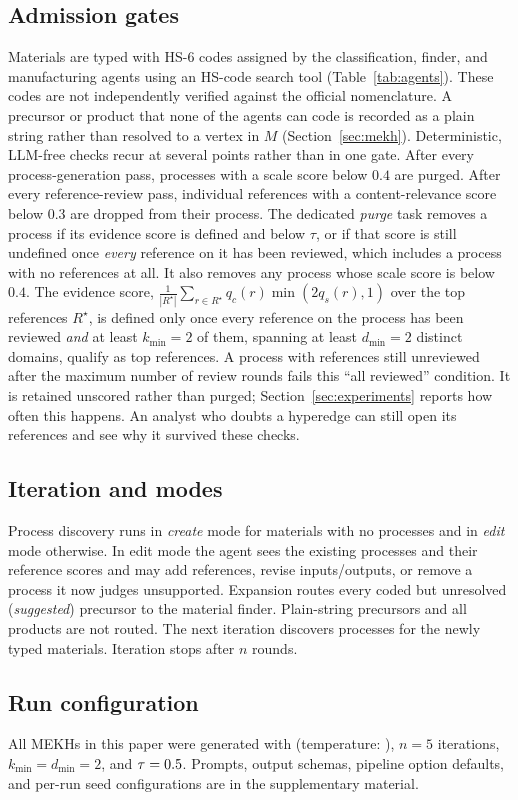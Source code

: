 \subsection{Admission gates}
\label{sec:gates}
Materials are typed with HS-6 codes assigned by the classification, finder, and manufacturing agents using an HS-code search tool (Table~\ref{tab:agents}). These codes are not independently verified against the official nomenclature. A precursor or product that none of the agents can code is recorded as a plain string rather than resolved to a vertex in $M$ (Section~\ref{sec:mekh}). Deterministic, LLM-free checks recur at several points rather than in one gate. After every process-generation pass, processes with a scale score below $0.4$ are purged. After every reference-review pass, individual references with a content-relevance score below $0.3$ are dropped from their process. The dedicated \emph{purge} task removes a process if its evidence score is defined and below $\tau$, or if that score is still undefined once \emph{every} reference on it has been reviewed, which includes a process with no references at all. It also removes any process whose scale score is below $0.4$. The evidence score, $\frac{1}{|R^\star|}\sum_{r\in R^\star} q_c(r)\min(2q_s(r),1)$ over the top references $R^\star$, is defined only once every reference on the process has been reviewed \emph{and} at least $k_{\min}=2$ of them, spanning at least $d_{\min}=2$ distinct domains, qualify as top references. A process with references still unreviewed after the maximum number of review rounds fails this ``all reviewed'' condition. It is retained unscored rather than purged; Section~\ref{sec:experiments} reports how often this happens. An analyst who doubts a hyperedge can still open its references and see why it survived these checks.

\subsection{Iteration and modes}
{\sloppy Process discovery runs in \emph{create} mode for materials with no processes and in \emph{edit} mode otherwise. In edit mode the agent sees the existing processes and their reference scores and may add references, revise inputs/outputs, or remove a process it now judges unsupported. Expansion routes every coded but unresolved (\emph{suggested}) precursor to the material finder. Plain-string precursors and all products are not routed. The next iteration discovers processes for the newly typed materials. Iteration stops after $n$ rounds.\par}

\subsection{Run configuration}
\label{sec:runconfig}
All MEKHs in this paper were generated with \GenModel{} (temperature: \GenTemp{}), $n=5$ iterations, $k_{\min}=d_{\min}=2$, and $\tau=0.5{}$. Prompts, output schemas, pipeline option defaults, and per-run seed configurations are in the supplementary material.
